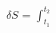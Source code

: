\documentclass[preview]{standalone}
\begin{document}
\begin{center}
$\delta S$ = $\int_{t_1}^{t_2}$
\end{center}
\end{document}
